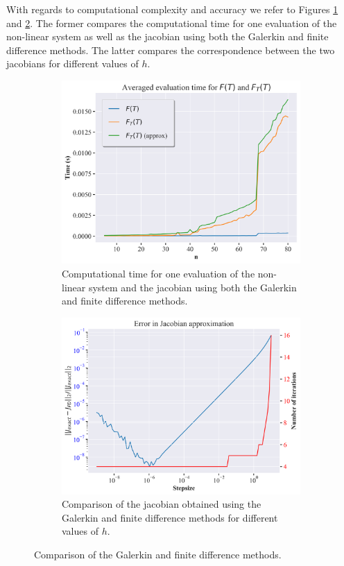 With regards to computational complexity and accuracy we refer to Figures \ref{fig:fd_vs_galerkin} and \ref{fig:jac_comparison}. The former compares the computational time for one evaluation of the non-linear system 
as well as the jacobian using both the Galerkin and finite difference methods. The latter compares the correspondence between the two jacobians for different values of $h$.
\begin{figure}[H]
    \centering
    \begin{subfigure}{0.45\textwidth}
        \centering
        \includegraphics[width=\textwidth]{figures/function_evaluation_time_n=80.png}
        \caption{Computational time for one evaluation of the non-linear system and the jacobian using both the Galerkin and finite difference methods.}
        \label{fig:fd_vs_galerkin}
    \end{subfigure}
    \begin{subfigure}{0.45\textwidth}
        \centering
        \includegraphics[width=\textwidth]{figures/jacobian_approximation_error.png}
        \caption{Comparison of the jacobian obtained using the Galerkin and finite difference methods for different values of $h$.}
        \label{fig:jac_comparison}
    \end{subfigure}
    \caption{Comparison of the Galerkin and finite difference methods.}
    \label{fig:fd_exact_comparison}
\end{figure}

